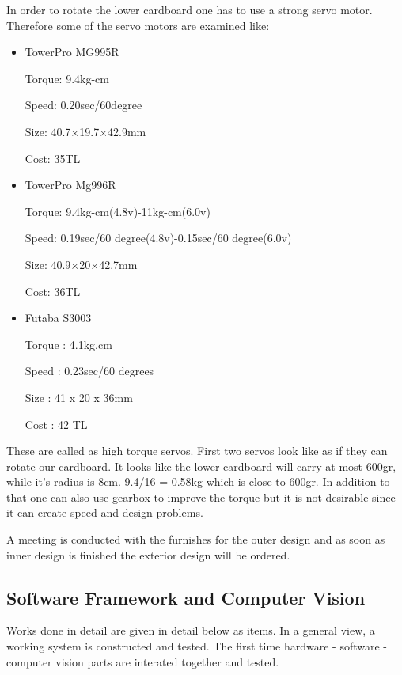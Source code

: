 In order to rotate the lower cardboard one has to use a strong servo motor. Therefore some of the servo motors are examined like:
\begin{itemize}
    \item TowerPro MG995R
    
    Torque: 9.4kg-cm
    
    Speed: 0.20sec/60degree
    
    Size: 40.7×19.7×42.9mm
    
    Cost: 35TL
    
    \item TowerPro Mg996R
    
    Torque: 9.4kg-cm(4.8v)-11kg-cm(6.0v)
    
    Speed: 0.19sec/60 degree(4.8v)-0.15sec/60 degree(6.0v)
    
    Size: 40.9×20×42.7mm
    
    Cost: 36TL
    
    \item Futaba S3003
    
    Torque : 4.1kg.cm
    
    Speed : 0.23sec/60 degrees
    
    Size : 41 x 20 x 36mm
    
    Cost : 42 TL
\end{itemize}

These are called as high torque servos. First two servos look like as if they can rotate our cardboard. It looks like the lower cardboard will carry at most 600gr, while it's radius is 8cm. 
 9.4/16 = 0.58kg which is close to 600gr. 
 In addition to that one can also use gearbox to improve the torque but it is not desirable since it can create speed and design problems. 
 
 A meeting is conducted with the furnishes for the outer design and as soon as inner design is finished the exterior design will be ordered. 
 
 
 
\subsection{Software Framework and Computer Vision}
Works done in detail are given in detail below as items. In a general view, a working system is constructed and tested. The first time hardware - software - computer vision parts are interated together and tested.

